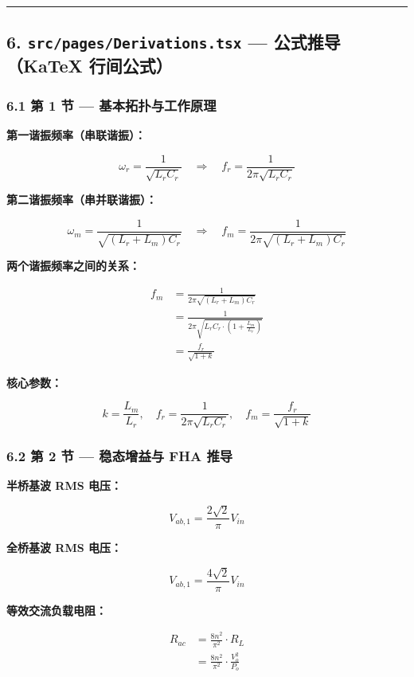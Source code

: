 \documentclass[UTF8]{ctexart}
\begin{document}
\noindent\rule{\textwidth}{0.4pt}

\subsection*{6. \texttt{src/pages/Derivations.tsx} — 公式推导（KaTeX 行间公式）}

\subsubsection*{6.1 第 1 节 — 基本拓扑与工作原理}

\textbf{第一谐振频率（串联谐振）：}

\[
\omega_r = \frac{1}{\sqrt{L_r C_r}} \quad \Rightarrow \quad f_r = \frac{1}{2\pi\sqrt{L_r C_r}}
\]

\textbf{第二谐振频率（串并联谐振）：}

\[
\omega_m = \frac{1}{\sqrt{(L_r + L_m) C_r}} \quad \Rightarrow \quad f_m = \frac{1}{2\pi\sqrt{(L_r + L_m) C_r}}
\]

\textbf{两个谐振频率之间的关系：}

\[
\begin{aligned}
f_m &= \frac{1}{2\pi\sqrt{(L_r + L_m) C_r}} \\
&= \frac{1}{2\pi\sqrt{L_r C_r \cdot \left(1 + \frac{L_m}{L_r}\right)}} \\
&= \frac{f_r}{\sqrt{1 + k}}
\end{aligned}
\]

\textbf{核心参数：}

\[
k = \frac{L_m}{L_r}, \quad f_r = \frac{1}{2\pi\sqrt{L_r C_r}}, \quad f_m = \frac{f_r}{\sqrt{1 + k}}
\]

\subsubsection*{6.2 第 2 节 — 稳态增益与 FHA 推导}

\textbf{半桥基波 RMS 电压：}

\[
V_{ab,1} = \frac{2\sqrt{2}}{\pi} V_{in}
\]

\textbf{全桥基波 RMS 电压：}

\[
V_{ab,1} = \frac{4\sqrt{2}}{\pi} V_{in}
\]

\textbf{等效交流负载电阻：}

\[
\begin{aligned}
R_{ac} &= \frac{8n^2}{\pi^2} \cdot R_L \\ &= \frac{8n^2}{\pi^2} \cdot \frac{V_o^2}{P_o}
\end{aligned}
\]
\end{document}
